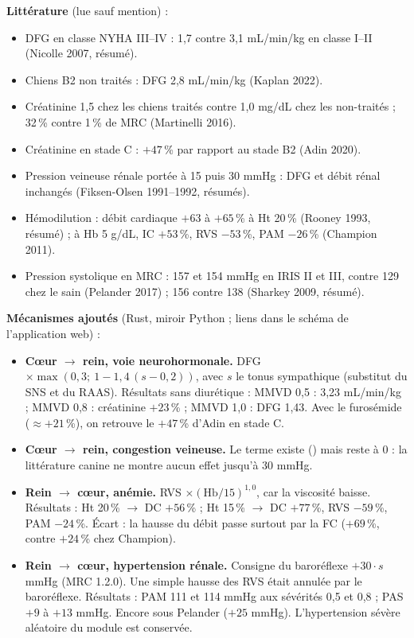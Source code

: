 \documentclass[10pt,a4paper]{article}
\newcommand{\vp}[1]{\path{#1}}
\begin{document}
\textbf{Littérature} (lue sauf mention) :
\begin{itemize}
\item DFG en classe NYHA III–IV : 1,7 contre 3,1 mL/min/kg en classe I–II (Nicolle 2007, résumé).
\item Chiens B2 non traités : DFG 2,8 mL/min/kg (Kaplan 2022).
\item Créatinine 1,5 chez les chiens traités contre 1,0 mg/dL chez les non-traités ; 32\,\% contre 1\,\% de MRC (Martinelli 2016).
\item Créatinine en stade C : $+47$\,\% par rapport au stade B2 (Adin 2020).
\item Pression veineuse rénale portée à 15 puis 30 mmHg : DFG et débit rénal inchangés (Fiksen-Olsen 1991–1992, résumés).
\item Hémodilution : débit cardiaque $+63$ à $+65$\,\% à Ht 20\,\% (Rooney 1993, résumé) ; à Hb 5 g/dL, IC $+53$\,\%, RVS $-53$\,\%, PAM $-26$\,\% (Champion 2011).
\item Pression systolique en MRC : 157 et 154 mmHg en IRIS II et III, contre 129 chez le sain (Pelander 2017) ; 156 contre 138 (Sharkey 2009, résumé).
\end{itemize}

\textbf{Mécanismes ajoutés} (Rust, miroir Python ; liens dans le schéma de l'application web) :
\begin{itemize}
\item \textbf{Cœur $\to$ rein, voie neurohormonale.} DFG $\times\max(0{,}3;\ 1 - 1{,}4\,(s - 0{,}2))$, avec $s$ le tonus sympathique (substitut du SNS et du RAAS). Résultats sans diurétique : MMVD 0,5 : 3,23 mL/min/kg ; MMVD 0,8 : créatinine $+23$\,\% ; MMVD 1,0 : DFG 1,43. Avec le furosémide ($\approx +21$\,\%), on retrouve le $+47$\,\% d'Adin en stade C.
\item \textbf{Cœur $\to$ rein, congestion veineuse.} Le terme existe (\vp{renal_k_cong}) mais reste à 0 : la littérature canine ne montre aucun effet jusqu'à 30 mmHg.
\item \textbf{Rein $\to$ cœur, anémie.} RVS $\times(\mathrm{Hb}/15)^{1{,}0}$, car la viscosité baisse. Résultats : Ht 20\,\% $\to$ DC $+56$\,\% ; Ht 15\,\% $\to$ DC $+77$\,\%, RVS $-59$\,\%, PAM $-24$\,\%. Écart : la hausse du débit passe surtout par la FC ($+69$\,\%, contre $+24$\,\% chez Champion).
\item \textbf{Rein $\to$ cœur, hypertension rénale.} Consigne du baroréflexe $+30\cdot s$ mmHg (MRC 1.2.0). Une simple hausse des RVS était annulée par le baroréflexe. Résultats : PAM 111 et 114 mmHg aux sévérités 0,5 et 0,8 ; PAS $+9$ à $+13$ mmHg. Encore sous Pelander ($+25$ mmHg). L'hypertension sévère aléatoire du module est conservée.
\end{itemize}
\end{document}
